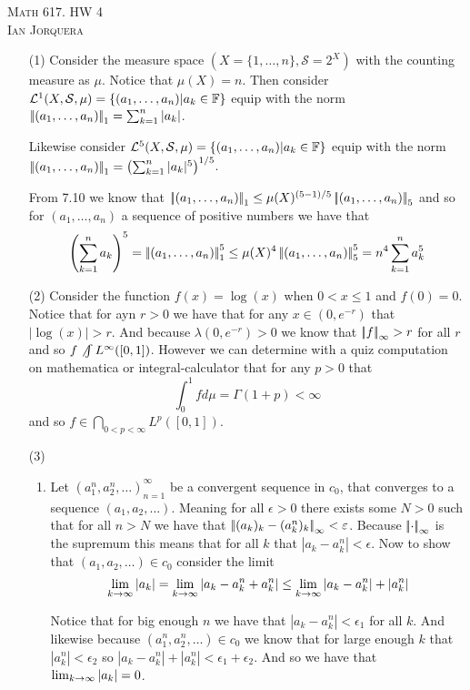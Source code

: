 \documentclass[12pt]{amsart}
\begin{document}
\begin{center}
   \textsc{Math 617. HW 4\\ Ian Jorquera}
\end{center}
\vspace{1em}

\begin{itemize}
   \item[(1)] Consider the measure space $(X=\{1,\dots,n\},\mathcal S=2^X)$ with the counting measure 
   as $\mu$. Notice that $\mu(X)=n$. Then consider $\mathcal L^1 (X,\mathcal S, \mu)=\{(a_1,\dots,a_n)|a_k\in \mathbb{F}\}$
   equip with the norm $\norm{(a_1,\dots,a_n)}_1=\sum_{k=1}^{n}|a_k|$.
   
   Likewise consider $\mathcal L^5 (X,\mathcal S, \mu)=\{(a_1,\dots,a_n)|a_k\in \mathbb{F}\}$ equip with the 
   norm $\norm{(a_1,\dots,a_n)}_1=\left(\sum_{k=1}^{n}|a_k|^5\right)^{1/5}$.

   From 7.10 we know that $\norm{(a_1,\dots,a_n)}_1\leq \mu(X)^{(5-1)/5}\norm{(a_1,\dots,a_n)}_5$ and so for 
   $(a_1,\dots,a_n)$ a sequence of positive numbers we have that
   \[\left(\sum_{k=1}^{n}a_k\right)^5=\norm{(a_1,\dots,a_n)}_1^5\leq \mu(X)^{4}\norm{(a_1,\dots,a_n)}_5^5=n^4\sum_{k=1}^{n}a_k^5\]


   \item[(2)] Consider the function $f(x)=\log(x)$ when $0<x\leq 1$ and $f(0)=0$. Notice that for ayn $r>0$ we have that for any $x\in(0,e^{-r})$ that $|\log(x)|>r$. 
   And because $\lambda(0,e^{-r})>0$ we know that $\norm{f}_\infty>r$ for all $r$ and so $f\not\int L^\infty([0,1])$.
   However we can determine with a quiz computation on mathematica or integral-calculator that for any $p>0$ that
   \[\int_{0}^1f d\mu=\Gamma(1+p)<\infty\]
   and so $f\in \bigcap_{0<p<\infty}L^p([0,1])$.
   \item[(3)]
   \begin{enumerate}[label=(\alph*)]
    \item Let $(a^n_1,a^n_2,\dots)_{n=1}^{\infty}$ be a convergent sequence in $c_0$, that converges 
    to a sequence $(a_1,a_2,\dots)$. Meaning for all $\epsilon>0$ there exists some $N>0$ such that for all $n>N$ we have that
    $\norm{(a_k)_k-(a^n_k)_k}_\infty<\epsilon$. Because $\norm{\cdot}_\infty$ is the supremum this means that
    for all $k$ that $|a_k-a_k^n|<\epsilon$.
    Now to show that $(a_1,a_2,\dots)\in c_0$ consider the limit
    \[\lim_{k\rightarrow\infty}|a_k|=\lim_{k\rightarrow\infty}|a_k-a^n_k+a^n_k|\leq\lim_{k\rightarrow\infty}|a_k-a^n_k|+|a^n_k|\]

    Notice that for big enough $n$ we have that $|a_k-a_k^n|<\epsilon_1$ for all $k$. And likewise because $(a^n_1,a^n_2,\dots)\in c_0$ we know that
    for large enough $k$ that $|a^n_k|<\epsilon_2$ so $|a_k-a^n_k|+|a^n_k|<\epsilon_1+\epsilon_2$. And so we have that $\lim_{k\rightarrow\infty}|a_k|=0$.


\end{enumerate}
\end{itemize}
\end{document}
